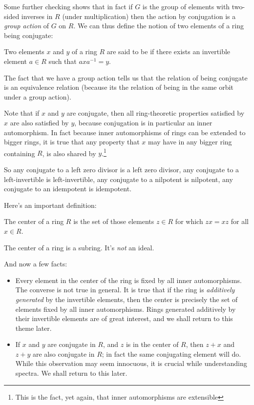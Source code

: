 \documentclass[a4paper]{amsart}
\begin{document}
Some further checking shows that in fact if $G$ is the group of
elements with two-sided inverses in $R$ (under multiplication) then
the action by conjugation is a {\em group action} of $G$ on $R$. We
can thus define the notion of two elements of a ring being conjugate:

\begin{definer}
  Two elements $x$ and $y$ of a ring $R$ are said to be
   if there exists an invertible
  element $a \in R$ such that $axa^{-1} = y$.
\end{definer}

The fact that we have a group action tells us that the relation of
being conjugate is an equivalence relation (because its the relation
of being in the same orbit under a group action).

Note that if $x$ and $y$ are conjugate, then all ring-theoretic
properties satisfied by $x$ are also satisfied by $y$, because
conjugation is in particular an inner automorphism. In fact because
inner automorphisms of rings can be extended to bigger rings, it is
true that any property that $x$ may have in any bigger ring containing
$R$, is also shared by $y$.\footnote{This is the fact, yet again, that
  inner automorphisms are extensible}

So any conjugate to a left zero divisor is a left zero divisor, any
conjugate to a left-invertible is left-invertible, any conjugate to a
nilpotent is nilpotent, any conjugate to an idempotent is idempotent.

Here's an important definition:
\begin{definer}
  The center of a ring $R$ is the set of those elements $z \in R$ for
  which $zx = xz$ for all $x \in R$.
\end{definer}

The center of a ring is a subring. It's {\em not} an ideal.

And now a few facts:

\begin{itemize}

\item Every element in the center of the ring is fixed by all inner
  automorphisms. The converse is not true in general. It
  is true that if the ring is {\em additively generated} by the
  invertible elements, then the center is precisely the set of
  elements fixed by all inner automorphisms. Rings generated
  additively by their invertible elements are of great interest, and
  we shall return to this theme later.

\item If $x$ and $y$ are conjugate in $R$, and $z$ is in the center of
  $R$, then $z + x$ and $z + y$ are also conjugate in $R$; in fact the
  same conjugating element will do. While this observation may seem
  innocuous, it is crucial while understanding spectra. We shall
  return to this later.

\end{itemize}
\end{document}
